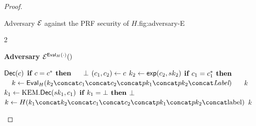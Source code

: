 \begin{proof}
\begin{itemize}
\begin{gamefigure}{Adversary $\mathcal{E}$ against the PRF security of $H$.}{fig:adversary-E}
\begin{games}{2}
\begin{gameenv}{\textbf{Adversary} $\mathcal{E}^{\textsf{Eval}_H(\cdot)}()$}
                \end{gameenv}
                \gamebreak
                \begin{gameenv}{\oracle $\textsf{Dec}(c)$}
                    \State $\textbf{if } c = c^* \textbf{ then}$
                    \State $\quad$ \Return $\bot$
                    \State $(c_1, c_2) \leftarrow c$
                    \State $k_2 \leftarrow \textsf{exp}(c_2, sk_2)$
                    \State $\textbf{if } c_1 = c^*_1 \textbf{ then}$
                    \State $\quad k \assign \Eval_{H}(k_2 \concat c_1 \concat c_2 \concat \pk_1 \concat \pk_2 \concat \lbl)$
                    \State $\quad$ \Return $k$
                    \State $k_1 \leftarrow \text{KEM}.\textsf{Dec}(sk_1,c_1)$
                    \State $\textbf{if } k_1 = \bot \textbf{ then}$
                    \State \quad \Return $\bot$
                    \State $k \assign H(\hashinput)$
                    \State \Return $k$
                \end{gameenv}
            \end{games}
        \end{gamefigure}

    \end{itemize}


\end{proof}
